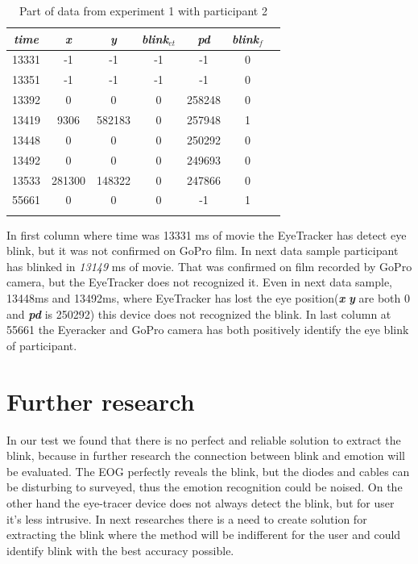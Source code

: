\documentclass[conference]{IEEEtran}
\begin{document}
\begin{table}[htbp]
	\caption{Part of data from experiment 1 with participant 2}
	\begin{center}
		\begin{tabular}{|c|c|c|c|c|c|c|}
			\hline
			 \textbf{\textit{time}}&\textbf{\textit{x}}& \textbf{\textit{y}}& \textbf{\textit{blink$_{et}$}} & \textbf{\textit{pd}} & \textbf{\textit{blink$_{f}$}}  \\ \hline
			 13331 & -1 & -1 & -1 & -1 & 0 \\ \hline
			 13351 & -1 & -1 & -1 & -1 & 0 \\ \hline
			 13392 & 0 & 0 & 0 & 258248 & 0 \\ \hline
			 13419 & 9306 & 582183 & 0 & 257948 & 1 \\ \hline
			 13448 & 0 & 0 & 0 & 250292 & 0 \\ \hline
			 13492 & 0 & 0 & 0 & 249693 & 0 \\ \hline
			 13533 & 281300 & 148322 & 0 & 247866 & 0 \\ \hline
			 55661&	0&	0	&0	&-1&	1 \\ \hline
			\hline
			
			\hline
			\multicolumn{1}{c}{}
		\end{tabular}
		\label{tab1}
	\end{center}
\end{table}
In first column where time was 13331 ms of movie the EyeTracker has detect eye blink, but it was not confirmed on GoPro film.
In next data sample participant has blinked in \textit{13149} ms of movie. That was confirmed on film recorded by GoPro camera, but the EyeTracker does not recognized it. Even in next data sample, 13448ms and 13492ms, where EyeTracker has lost the eye position(\textbf{\textit{x}} \textbf{\textit{y}} are both 0 and \textbf{\textit{pd}} is 250292) this device does not recognized the blink. 
In last column at 55661 the Eyeracker and GoPro camera has both positively identify the eye blink of participant.
\section{Further research}
In our test we found that there is no perfect and reliable solution to extract the blink, because in further research the connection between blink and emotion will be evaluated. The EOG perfectly reveals the  blink, but the diodes and cables can be disturbing to surveyed, thus the emotion recognition could be noised. On the  other hand the eye-tracer device does not always detect the blink, but for user it's less intrusive.  In next researches there is a need to create solution for extracting the blink where the method will be indifferent for the user and could identify blink with the best accuracy possible.
\end{document}
